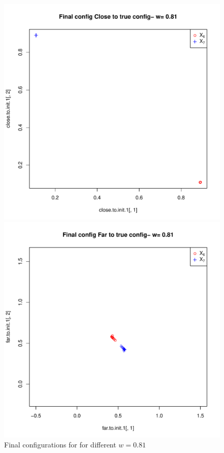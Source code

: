 \documentclass[12pt,oneside,final]{thesis}
\begin{document}
\begin{figure}
\begin{minipage}[b]{0.5\linewidth}
\centering
\includegraphics[scale=0.45]{true-min-w0_81.pdf}


\end{minipage}
\hspace{0.5cm}
\begin{minipage}[b]{0.5\linewidth}
\centering
\includegraphics[scale=0.45]{other-min-w0_81.pdf}


\end{minipage}

\caption{Final configurations for for different $w=0.81$ }
\label{fig:Finalconfig-MultMin-w-0_81}

\end{figure}
\end{document}
